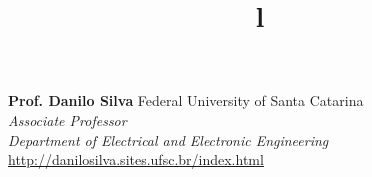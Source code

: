 \documentclass[margin, line]{res}
\begin{document}
\begin{resume}
\textbf{Prof. Danilo Silva} \hfill Federal University of Santa Catarina\\
{\sl Associate Professor}\\
{\sl Department of Electrical and Electronic Engineering}\\
\url{http://danilosilva.sites.ufsc.br/index.html}

\begin{format}
\title{l}\\
\\
\body\\
\end{format}

\end{resume}
\(\)
\end{document}
